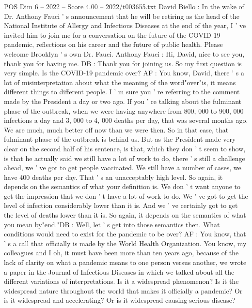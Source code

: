 \begin{textsample}{POS Dim 6 – 2022 – Score 4.00 – 2022/t003655.txt}  \label{ex:f6_pos_067}
David Biello : In the wake of Dr.
Anthony Fauci ' s announcement that he will be retiring as the head of the National Institute of Allergy and Infectious Diseases at the end of the year, I ' ve invited him to join me for a conversation on the future of the COVID-19 pandemic, reflections on his career and the future of public health.
Please welcome Brooklyn ' s own Dr.
Fauci.
Anthony Fauci : Hi, David, nice to see you, thank you for having me.
DB : Thank you for joining us.
So my first question is very simple.
Is the COVID-19 pandemic over?
AF : You know, David, there ' s a lot of misinterpretation about what the meaning of the word"over"is, it means different things to different people.
I ' m sure you ' re referring to the comment made by the President a day or two ago.
If you ' re talking about the fulminant phase of the outbreak, when we were having anywhere from 800, 000 to 900, 000 infections a day and 3, 000 to 4, 000 deaths per day, that was several months ago.
We are much, much better off now than we were then.
So in that case, that fulminant phase of the outbreak is behind us.
But as the President made very clear on the second half of his sentence, is that, which they don ' t seem to show, is that he actually said we still have a lot of work to do, there ' s still a challenge ahead, we ' ve got to get people vaccinated.
We still have a number of cases, we have 400 deaths per day.
That ' s an unacceptably high level.
So again, it depends on the semantics of what your definition is.
We don ' t want anyone to get the impression that we don ' t have a lot of work to do.
We ' ve got to get the level of infection considerably lower than it is.
And we ' ve certainly got to get the level of deaths lower than it is.
So again, it depends on the semantics of what you mean by"end."DB : Well, let ' s get into those semantics then.
What conditions would need to exist for the pandemic to be over?
AF : You know, that ' s a call that officially is made by the World Health Organization.
You know, my colleagues and I oh, it must have been more than ten years ago, because of the lack of clarity on what a pandemic means to one person versus another, we wrote a paper in the Journal of Infectious Diseases in which we talked about all the different variations of interpretations.
Is it a widespread phenomenon?
Is it the widespread nature throughout the world that makes it officially a pandemic?
Or is it widespread and accelerating?
Or is it widespread causing serious disease?

\end{textsample}
